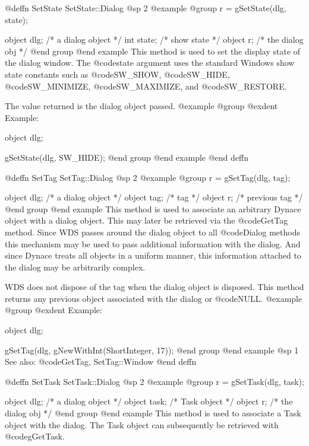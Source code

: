 @deffn {SetState} SetState::Dialog
@sp 2
@example
@group
r = gSetState(dlg, state);

object  dlg;     /*  a dialog object  */
int     state;   /*  show state       */
object  r;       /*  the dialog obj   */
@end group
@end example
This method is used to set the display state of the dialog window.
The @code{state} argument uses the standard Windows show state constants
such as @code{SW_SHOW}, @code{SW_HIDE}, @code{SW_MINIMIZE},
@code{SW_MAXIMIZE}, and @code{SW_RESTORE}.

The value returned is the dialog object passed.
@example
@group
@exdent Example:

object  dlg;

gSetState(dlg, SW_HIDE);
@end group
@end example
@end deffn




@deffn {SetTag} SetTag::Dialog
@sp 2
@example
@group
r = gSetTag(dlg, tag);

object  dlg;   /*  a dialog object   */
object  tag;    /*  tag               */
object  r;      /*  previous tag      */
@end group
@end example
This method is used to associate an arbitrary Dynace object with a
dialog object.  This may later be retrieved via the @code{GetTag} method.
Since WDS passes around the dialog object to all @code{Dialog} methods
this mechanism may be used to pass additional information with the
dialog.  And since Dynace treats all objects in a uniform manner, this
information attached to the dialog may be arbitrarily complex.

WDS does not dispose of the tag when the dialog object is disposed.
This method returns any previous object associated with the dialog or
@code{NULL}.
@example
@group
@exdent Example:

object  dlg;

gSetTag(dlg, gNewWithInt(ShortInteger, 17));
@end group
@end example
@sp 1
See also:  @code{GetTag, SetTag::Window}
@end deffn











@deffn {SetTask} SetTask::Dialog
@sp 2
@example
@group
r = gSetTask(dlg, task);

object  dlg;    /*  a dialog object  */
object  task;   /*  Task object      */
object  r;      /*  the dialog obj   */
@end group
@end example
This method is used to associate a Task object with the dialog.  The
Task object can subsequently be retrieved with @code{gGetTask}.

